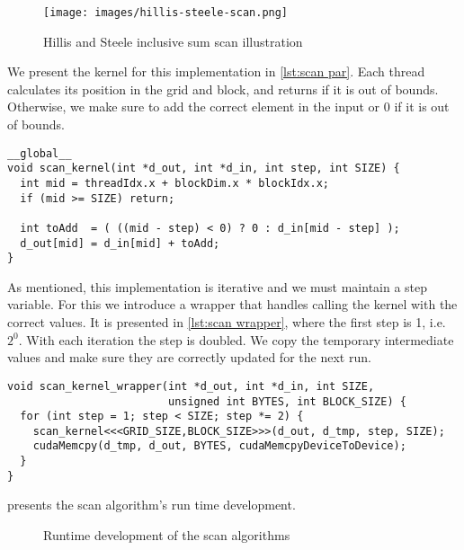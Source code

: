 \begin{figure}[htb]
  \centering
  \texttt{[image: images/hillis-steele-scan.png]}
  \caption{Hillis and Steele inclusive sum scan illustration}
  \label{fig:hillis steele scan}
\end{figure}

We present the kernel for this implementation in \cref{lst:scan par}.
Each thread calculates its position in the grid and block, and returns if it is out of bounds.
Otherwise, we make sure to add the correct element in the input or 0 if it is out of bounds.

\begin{lstlisting}[caption={Hillis and Steele scan kernel}, label={lst:scan par}]
__global__
void scan_kernel(int *d_out, int *d_in, int step, int SIZE) {
  int mid = threadIdx.x + blockDim.x * blockIdx.x;
  if (mid >= SIZE) return;

  int toAdd  = ( ((mid - step) < 0) ? 0 : d_in[mid - step] );
  d_out[mid] = d_in[mid] + toAdd;
}
\end{lstlisting}

As mentioned, this implementation is iterative and we must maintain a step variable.
For this we introduce a wrapper that handles calling the kernel with the correct values.
It is presented in \cref{lst:scan wrapper}, where the first step is 1, i.e. $2^0$.
With each iteration the step is doubled.
We copy the temporary intermediate values and make sure they are correctly updated for the next run.

\begin{lstlisting}[caption={Hillis and Steele scan kernel wrapper}, label={lst:scan wrapper}]
void scan_kernel_wrapper(int *d_out, int *d_in, int SIZE, 
                         unsigned int BYTES, int BLOCK_SIZE) {
  for (int step = 1; step < SIZE; step *= 2) {
    scan_kernel<<<GRID_SIZE,BLOCK_SIZE>>>(d_out, d_tmp, step, SIZE);
    cudaMemcpy(d_tmp, d_out, BYTES, cudaMemcpyDeviceToDevice);
  }
}
\end{lstlisting}

 presents the scan algorithm's run time development.


\begin{figure}[htb]
  \centering
  
  \caption{Runtime development of the scan algorithms}
  \label{fig:scan plot}
\end{figure}%
